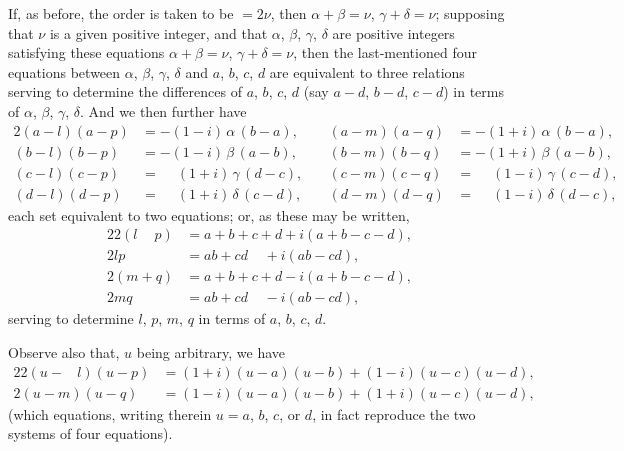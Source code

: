 \documentclass[11pt,a4paper]{book}
\begin{document}
If, as before, the order is taken to be $=2\nu$, then $\alpha+\beta = \nu$, $\gamma+\delta = \nu$; supposing that $\nu$ is a given positive integer, and that $\alpha$, $\beta$, $\gamma$, $\delta$ are positive integers satisfying these equations $\alpha+\beta = \nu$, $\gamma+\delta = \nu$, then the last-mentioned four equations between $\alpha$, $\beta$, $\gamma$, $\delta$ and $a$, $b$, $c$, $d$ are equivalent to three relations serving to determine the differences of $a$, $b$, $c$, $d$ (say $a-d$, $b-d$, $c-d$) in terms of $\alpha$, $\beta$, $\gamma$, $\delta$. And we then further have
\begin{alignat*}{2}
(a-l)(a-p) &= -(1-i)\,\alpha\, (b-a), &\quad (a-m)(a-q) &= -(1+i)\,\alpha\, (b-a), \\
(b-l)(b-p) &= -(1-i)\,\beta\, (a-b), &\quad (b-m)(b-q) &= -(1+i)\,\beta\, (a-b), \\
(c-l)(c-p) &= \phantom{-}(1+i)\,\gamma\, (d-c), &\quad (c-m)(c-q) &= \phantom{-}(1-i)\,\gamma\, (c-d), \\
(d-l)(d-p) &= \phantom{-}(1+i)\,\delta\, (c-d), &\quad (d-m)(d-q) &= \phantom{-}(1-i)\,\delta\, (d-c),
\end{alignat*}
each set equivalent to two equations; or, as these may be written,
\begin{alignat*}{2}
2(l\phantom{+}p) &= a+b+c+d + i(a+b-c-d), \\
2lp\phantom{)} &= ab+cd \phantom{+ i} + i(ab-cd), \\
2(m+q) &= a+b+c+d - i(a+b-c-d), \\
2mq\phantom{)} &= ab+cd \phantom{+ i} - i(ab-cd),
\end{alignat*}
serving to determine $l$, $p$, $m$, $q$ in terms of $a$, $b$, $c$, $d$.

Observe also that, $u$ being arbitrary, we have
\begin{alignat*}{2}
2(u-\phantom{m}l)(u-p) &= (1+i)(u-a)(u-b) + (1-i)(u-c)(u-d), \\
2(u-m)(u-q) &= (1-i)(u-a)(u-b) + (1+i)(u-c)(u-d),
\end{alignat*}
(which equations, writing therein $u=a$, $b$, $c$, or $d$, in fact reproduce the two systems of four equations).
\end{document}
